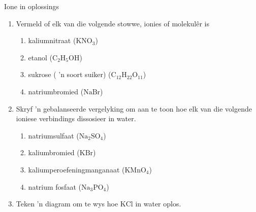 \begin{exercises}{Ione in oplossings}
{
\begin{enumerate}[noitemsep, label=\textbf{\arabic*}. ] 
\item Vermeld of elk van die volgende stowwe, ionies of molekul\^{e}r is
    \begin{enumerate}[noitemsep, label=\textbf{\alph*}. ] 
    \item kaliumnitraat ($\text{KNO}_{3}$)
    \item etanol ($\text{C}_{2}\text{H}_{5}\text{OH}$)
    \item sukrose ( 'n soort suiker) ($\text{C}_{12}\text{H}_{22}\text{O}_{11}$)
    \item natriumbromied ($\text{NaBr}$)
    \end{enumerate}
\item Skryf  'n gebalanseerde vergelyking om aan te toon hoe elk van die volgende ioniese verbindings dissosieer in water.
    \begin{enumerate}[noitemsep, label=\textbf{\alph*}. ] 
    \item natriumsulfaat ($\text{Na}_{2}\text{SO}_{4}$)
    \item kaliumbromied ($\text{KBr}$)
    \item kaliumperoefeningmanganaat ($\text{KMnO}_{4}$)
    \item natrium fosfaat ($\text{Na}_{3}\text{PO}_{4}$)
    \end{enumerate}
\item Teken  'n diagram om te wys hoe $\text{KCl}$ in water oplos.
\end{enumerate}

}
\end{exercises}
